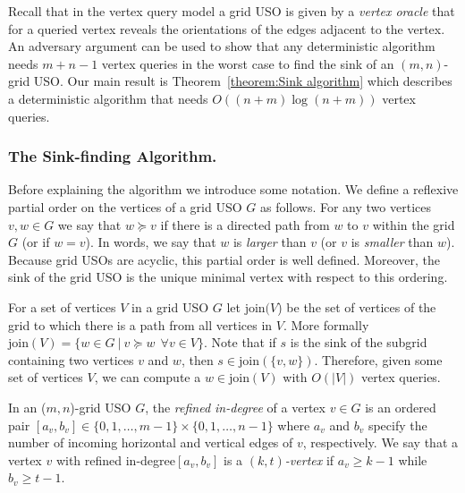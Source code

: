 \documentclass[runningheads,a4paper]{llncs}
\newcommand{\JN}[1]{\marginpar{\parbox{3.6cm}{{\small {\bf JN:} #1}}}} %
\newcommand{\indegree}{refined in-degree\xspace}
\newcommand{\join}{\mbox{join}\xspace}
\begin{document}
Recall that in the vertex query model a grid USO is given by a \emph{vertex oracle} that for a queried vertex reveals the orientations of the edges adjacent to the vertex. 
An adversary argument can be used to show that any deterministic algorithm needs $m+n-1$ vertex queries in the worst case to find the sink of an $(m, n)$-grid USO.
Our main result is Theorem~\ref{theorem:Sink algorithm} which describes a deterministic algorithm that needs $O((n + m) \log (n + m))$ vertex queries. 

\vspace{-.2in}\subsubsection{The Sink-finding Algorithm.}
\label{section:the_sink_finding_algorithm}

Before explaining the algorithm we introduce some notation. We define a reflexive partial order on the vertices of a grid USO $G$ as follows. 
For any two vertices $v,w \in G$ we say that $w \succeq v$ if there is a directed path from $w$ to $v$ within the grid $G$ (or if $w = v$). 
In words, we say that $w$ is \emph{larger} than $v$ (or $v$ is \emph{smaller} than $w$).
Because grid USOs are acyclic, this partial order is well defined.
Moreover, the sink of the grid USO is the unique minimal vertex with respect to this ordering. 

For a set of vertices $V$ in a grid USO $G$ let $\join(V$) be the set of vertices of the grid to which there is a path from all vertices in $V$.  More formally $\join(V) = \{w \in G \: | \: v \succeq w \:\: \forall v \in V \}$. Note that if $s$ is the sink of the subgrid containing two vertices $v$ and $w$, then $s \in \join(\{v,w\})$. Therefore, given some set of vertices $V$, we can compute a $w \in \join(V)$ with $O(|V|)$ vertex queries.


In an ($m,n$)-grid USO $G$, the \emph{\indegree} of a vertex $v \in G$ is an ordered pair $[a_v, b_v] \in \{0,1,\ldots,m-1\}\times \{0,1,\ldots,n-1\}$ where $a_v$ and $b_v$ specify the number of incoming horizontal  and vertical edges of $v$, respectively.
We say that a vertex $v$ with \indegree $[a_v, b_v]$ is a \emph{$(k, t)$-vertex} if $a_v\geq k-1$ while $b_v\geq t-1$.
\end{document}
